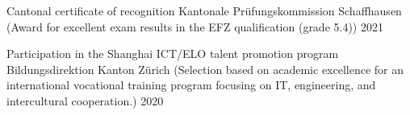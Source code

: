 
\begin{cvhonors}
  \cvhonor
    {Cantonal certificate of recognition} %
    {Kantonale Prüfungskommission Schaffhausen (Award for excellent exam results in the EFZ qualification (grade 5.4))} %
    {} %
    {2021} %

  \cvhonor
    {Participation in the Shanghai ICT/ELO talent promotion program} %
    {Bildungsdirektion Kanton Zürich (Selection based on academic excellence for an international vocational training program focusing on IT, engineering, and intercultural cooperation.)} %
    {} %
    {2020} %
\end{cvhonors}

